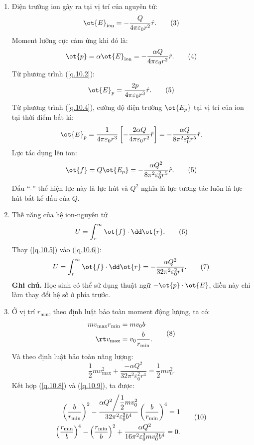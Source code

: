 \begin{loigiai}
\begin{enumerate}[1)]
    \item  Điện trường ion gây ra tại vị trí của nguyên tử:
    \[\ot{E}_\text{ion}=-\dfrac{Q}{4 \pi \varepsilon_{0} r^{2}} \hat{r}. \tag{3}\label{q.10.3}\]
    Moment lưỡng cực cảm ứng khi đó là:
    \[\ot{p}=\alpha \ot{E}_{\text {ion}} = -\dfrac{\alpha Q}{4 \pi \varepsilon_{0} r^{2}} \hat{r}. \tag{4}\label{q.10.4}\]
    Từ phương trình (\ref{q.10.2}): 
    \[\ot{E}_{p}=\dfrac{2 p}{4 \pi \varepsilon_{0} r^{3}} \hat{r}. \tag{5}\label{q.10.5} \]
    Từ phương trình (\ref{q.10.4}), cường độ điện trường $\ot{E_p}$ tại vị trí của ion tại thời điểm bất kì:
    \[\ot{E}_{p} = \dfrac{1}{4 \pi \varepsilon_{0} r^{3}}\left[-\dfrac{2 \alpha Q}{4 \pi \varepsilon_{0} r^{2}} \hat{r}\right] = -\dfrac{\alpha Q}{8 \pi^{2} \varepsilon_{0}^{2} r^{5}} \hat{r}. \]
    Lực tác dụng lên ion:
    \[\ot{f} = Q\ot{E_p} = -\dfrac{\alpha Q^2}{8 \pi^{2} \varepsilon_{0}^{2} r^{5}} \hat{r}.\tag{5}\label{q.10.5} \]
    Dấu ``-'' thể hiện lực này là lực hút và $Q^2$ nghĩa là lực tương tác luôn là lực hút bất kể dấu của $Q$.
    \item Thế năng của hệ ion-nguyên tử 
    \[U =\int_r^\infty \ot{f} \cdot \dd \ot{r}.  \tag{6}\label{q.10.6}\]
    Thay (\ref{q.10.5}) vào (\ref{q.10.6}):  \[U=\int_{r}^{\infty} \ot{f} \cdot \dd \ot{r} = -\dfrac{\alpha Q^{2}}{32 \pi^{2} \varepsilon_{0}^{2} r^{4}}.\tag{7}\label{q.10.7}\] 
    \textbf{Ghi chú.} Học sinh có thể sử dụng thuật ngữ $- \ot{p}\cdot \ot{E}$, điều này chỉ làm thay đổi hệ số ở phía trước.  
    \item Ở vị trí $r_{\min}$, theo định luật bảo toàn moment động lượng, ta có:
    \[\begin{aligned}
    m v_{\max} r_{\min} &= m v_{0} b \\
    \rt v_{\max } &= v_{0} \dfrac{b}{r_{\min }}. 
    \end{aligned}\tag{8}\label{q.10.8} \]
    Và theo định luật bảo toàn năng lượng: 
    \[\dfrac{1}{2} m v_{\max }^{2} + \dfrac{-\alpha Q^{2}}{32 \pi^{2} \varepsilon_{0}^{2} r^{4}}=\dfrac{1}{2} m v_{0}^{2}.\tag{9}\label{q.10.9}\]
    Kết hợp (\ref{q.10.8}) và (\ref{q.10.9}), ta được:
    \[\begin{aligned}
    \left(\dfrac{b}{r_{\min }}\right)^{2}-\dfrac{\alpha Q^{2} \bigg{/} \dfrac{1}{2} m v_{0}^{2}}{32 \pi^{2} \varepsilon_{0}^{2} b^{4}}\left(\dfrac{b}{r_{\min }}\right)^{4}=1 \\
    \left(\dfrac{r_{\min }}{b}\right)^{4}-\left(\dfrac{r_{\min }}{b}\right)^{2}+\dfrac{\alpha Q^{2}}{16 \pi^{2} \varepsilon_{0}^{2} m v_{0}^{2} b^{4}}=0.
    \end{aligned}\tag{10}\label{q.10.10}\]

\end{enumerate}
\end{loigiai}
